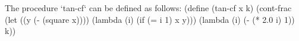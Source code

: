 The procedure `tan-cf` can be defined as follows:
\begtt\scm 
(define (tan-cf x k)
  (cont-frac (let ((y (- (square x))))
               (lambda (i) (if (= i 1) x y)))
             (lambda (i) (- (* 2.0 i) 1))
             k))
\endtt
